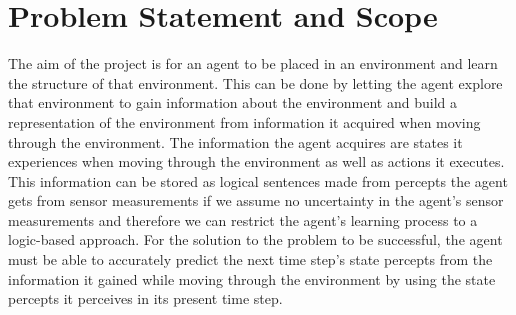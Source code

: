 
\section{Problem Statement and Scope}
\label{sec:problem_statement}



The aim of the project is for an agent to be placed in an environment and learn the structure of that environment. This can be done by letting the agent explore that environment to gain information about the environment and build a representation of the environment from information it acquired when moving through the environment. The information the agent acquires are states it experiences when moving through the environment as well as actions it executes. This information can be stored as logical sentences made from percepts the agent gets from sensor measurements if we assume no uncertainty in the agent's sensor measurements and therefore we can restrict the agent's learning process to a logic-based approach.
For the solution to the problem to be successful, the agent must be able to accurately predict the next time step's state percepts from the information it gained  while moving through the environment by using the state percepts it perceives in its present time step.




